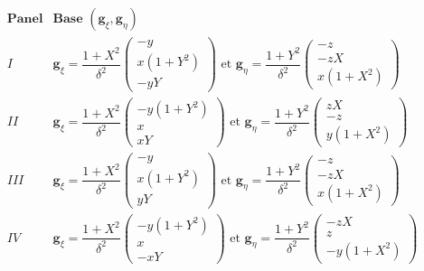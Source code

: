 \begin{table}[htbp]
\begin{center}
\begin{equation*}
\begin{array}{|c|c|}
\hline
\textbf{Panel} & \textbf{Base } \left( \mathbf{g}_{\xi}, \mathbf{g}_{\eta} \right)\\

\hline
\hline
I & \mathbf{g}_{\xi} = \dfrac{1+X^2}{\delta^2} \begin{pmatrix}
-y \\ x(1+Y^2) \\ -yY
\end{pmatrix} \text{ et } \mathbf{g}_{\eta} = \dfrac{1+Y^2}{\delta^2} \begin{pmatrix}
-z \\ -zX \\ x(1+X^2)
\end{pmatrix} \\

\hline
II & \mathbf{g}_{\xi} = \dfrac{1+X^2}{\delta^2} \begin{pmatrix}
-y(1+Y^2) \\ x \\ xY
\end{pmatrix} \text{ et } \mathbf{g}_{\eta} = \dfrac{1+Y^2}{\delta^2} \begin{pmatrix}
zX \\ -z \\ y(1+X^2)
\end{pmatrix} \\

\hline
III & \mathbf{g}_{\xi} = \dfrac{1+X^2}{\delta^2} \begin{pmatrix}
-y \\ x(1+Y^2) \\ yY
\end{pmatrix} \text{ et } \mathbf{g}_{\eta} = \dfrac{1+Y^2}{\delta^2} \begin{pmatrix}
-z \\ -zX \\ x(1+X^2)
\end{pmatrix} \\

\hline
IV & \mathbf{g}_{\xi} = \dfrac{1+X^2}{\delta^2} \begin{pmatrix}
-y(1+Y^2) \\ x \\ -xY
\end{pmatrix} \text{ et } \mathbf{g}_{\eta} = \dfrac{1+Y^2}{\delta^2} \begin{pmatrix}
-zX \\ z \\ -y(1+X^2)
\end{pmatrix} \\


\end{array}
\end{equation*}
\end{center}
\end{table}
